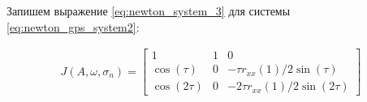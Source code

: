 Запишем выражение \ref{eq:newton_system_3} для системы \ref{eq:newton_gps_system2}:
\begin{center}
\begin{eqnarray}
	\label{eq:newton_system_3}
	J(A, \omega, \sigma_n) = 
		\left[ \begin{array}{ccc}
		1 & 1 & 0 \\
		\cos(\tau) & 0 & - \tau r_{xx}(1)/2 \sin(\tau) \\
		\cos(2\tau) & 0 & -2 \tau r_{xx}(1)/2 \sin(2 \tau)
		\end{array} \right]
\end{eqnarray}
\end{center}
\newpage

